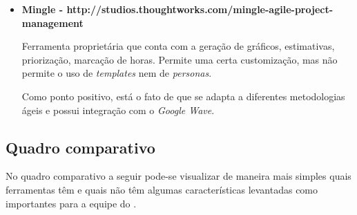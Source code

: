 \begin{itemize}
{Um diferencial está no fato de que permite integração com a IDE Eclipse.}

\item{\textbf{Mingle - http://studios.thoughtworks.com/mingle-agile-project-management}

Ferramenta proprietária que conta com a geração de gráficos, estimativas, priorização, marcação de horas. Permite uma certa customização, mas não permite o uso de \textit{templates} nem de \textit{personas}. 

Como ponto positivo, está o fato de que se adapta a diferentes metodologias ágeis e possui integração com o \textit{Google Wave}.}

\end{itemize}

\subsection{Quadro comparativo}

No quadro comparativo a seguir pode-se visualizar de maneira mais simples quais ferramentas têm e quais não têm algumas características levantadas como importantes para a equipe do \calopsita{}. 

